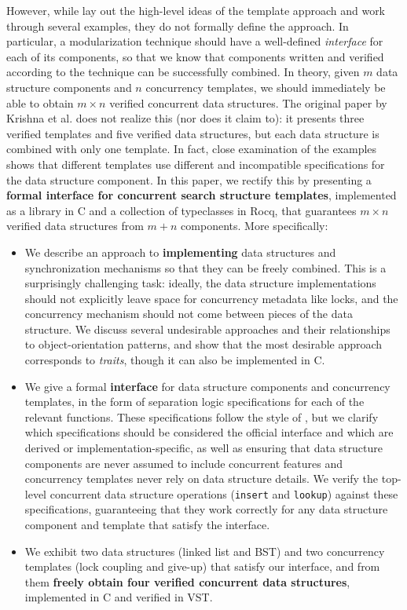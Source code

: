 \documentclass[sigplan,screen]{acmart}
\begin{document}
However, while \citet{templates} lay out the high-level ideas of the template approach and work through several examples, they do not formally define the approach. In particular, a modularization technique should have a well-defined \emph{interface} for each of its components, so that we know that components written and verified according to the technique can be successfully combined. In theory, given $m$ data structure components and $n$ concurrency templates, we should immediately be able to obtain $m \times n$ verified concurrent data structures. The original paper by Krishna et al. does not realize this (nor does it claim to): it presents three verified templates and five verified data structures, but each data structure is combined with only one template. In fact, close examination of the examples shows that different templates use different and incompatible specifications for the data structure component. In this paper, we rectify this by presenting a \textbf{formal interface for concurrent search structure templates}, implemented as a library in C and a collection of typeclasses in Rocq, that guarantees $m \times n$ verified data structures from $m + n$ components. More specifically:
\begin{itemize}
\item We describe an approach to \textbf{implementing} data structures and synchronization mechanisms so that they can be freely combined. This is a surprisingly challenging task: ideally, the data structure implementations should not explicitly leave space for concurrency metadata like locks, and the concurrency mechanism should not come between pieces of the data structure. We discuss several undesirable approaches and their relationships to object-orientation patterns, and show that the most desirable approach corresponds to \emph{traits}, though it can also be implemented in C.
\item We give a formal \textbf{interface} for data structure components and concurrency templates, in the form of separation logic specifications for each of the relevant functions. These specifications follow the style of \citet{templates}, but we clarify which specifications should be considered the official interface and which are derived or implementation-specific, as well as ensuring that data structure components are never assumed to include concurrent features and concurrency templates never rely on data structure details. We verify the top-level concurrent data structure operations (\lstinline{insert} and \lstinline{lookup}) against these specifications, guaranteeing that they work correctly for any data structure component and template that satisfy the interface.
\item We exhibit two data structures (linked list and BST) and two concurrency templates (lock coupling and give-up) that satisfy our interface, and from them \textbf{freely obtain four verified concurrent data structures}, implemented in C and verified in VST. %
\end{itemize}
\end{document}
